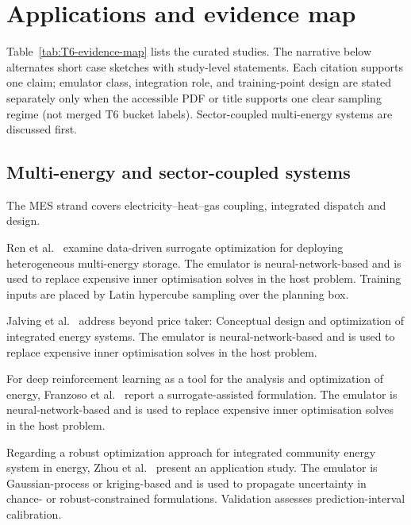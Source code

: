 \section{Applications and evidence map}
\label{sec:applications}

Table~\ref{tab:T6-evidence-map} lists the curated studies.
The narrative below alternates short case sketches with study-level statements.
Each citation supports one claim; emulator class, integration role, and
training-point design are stated separately only when the accessible PDF
or title supports one clear sampling regime (not merged T6 bucket labels).
Sector-coupled multi-energy systems are discussed first.



\subsection{Multi-energy and sector-coupled systems}
\label{sec:apps:mes}

The MES strand covers electricity--heat--gas coupling, integrated dispatch and design.

Ren et al.~\cite{Ren2024} examine data-driven surrogate optimization for deploying heterogeneous multi-energy storage. The emulator is neural-network-based and is used to replace expensive inner optimisation solves in the host problem. Training inputs are placed by Latin hypercube sampling over the planning box.

Jalving et al.~\cite{Jalving2023} address beyond price taker: Conceptual design and optimization of integrated energy systems. The emulator is neural-network-based and is used to replace expensive inner optimisation solves in the host problem.

For deep reinforcement learning as a tool for the analysis and optimization of energy, Franzoso et al.~\cite{Franzoso2025} report a surrogate-assisted formulation. The emulator is neural-network-based and is used to replace expensive inner optimisation solves in the host problem.

Regarding a robust optimization approach for integrated community energy system in energy, Zhou et al.~\cite{Zhou20181} present an application study. The emulator is Gaussian-process or kriging-based and is used to propagate uncertainty in chance- or robust-constrained formulations. Validation assesses prediction-interval calibration.

